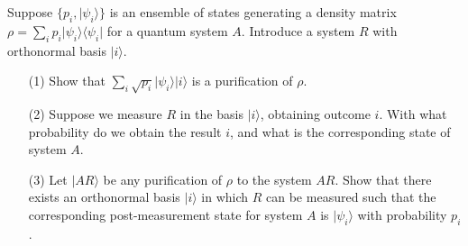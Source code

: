 \documentclass[en]{sol-man}
\begin{document}
\begin{exe}
    Suppose $\{p_i,\lvert\psi_i\rangle\}$ is an ensemble of states generating a density matrix $\rho=\sum_ip_i\lvert\psi_i\rangle\langle\psi_i\rvert$ for a quantum system $A$. Introduce a system $R$ with orthonormal basis $\lvert i\rangle$.
    \begin{itemize}
        \item[(1)] Show that $\sum_i\sqrt{p_i}\lvert\psi_i\rangle\lvert i\rangle$ is a purification of $\rho$.
        \item[(2)] Suppose we measure $R$ in the basis $\lvert i\rangle$, obtaining outcome $i$. With what probability do we obtain the result $i$, and what is the corresponding state of system $A$.
        \item[(3)] Let $\lvert AR\rangle$ be any purification of $\rho$ to the system $AR$. Show that there exists an orthonormal basis $\lvert i\rangle$ in which $R$ can be measured such that the corresponding post-measurement state for system $A$ is $\lvert\psi_i\rangle$ with probability $p_i$.
    \end{itemize}
\end{exe}
\begin{sol}
    
\end{sol}

\ifx\allfiles\undefined


\end{document}
